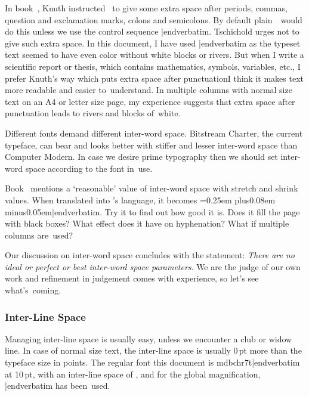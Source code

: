 {{In book~\cite{knuth_texbook}, Knuth instructed \capstex\ to give some extra space after periods, commas, question and exclamation marks, colons and semicolons. By default plain~\capstex\ would do this unless we use the control sequence {\color{brown}\verbatim \frenchspacing|endverbatim}. Tschichold urges not to give such extra space. In this document, I have used {\color{brown}\verbatim \frenchspacing|endverbatim} as the typeset text seemed to have even color without white blocks or rivers. But when I write a scientific report or thesis, which contains mathematics, symbols, variables, etc., I prefer Knuth's way which puts extra space after punctuation\emdash I think it makes text more readable and easier to~understand. In multiple columns with normal size text on an A4 or letter size page, my experience suggests that extra space after punctuation leads to rivers and blocks of~white.

Different fonts demand different inter-word space. Bitstream Charter, the current typeface, can bear and looks better with stiffer and lesser inter-word space than Computer Modern. In case we desire prime typography then we should set inter-word space according to the font in~use.

Book~\cite{elements_typographic} mentions a `reasonable' value of inter-word space with stretch and shrink values. When translated into \capstex's language, it becomes {\color{brown}\verbatim \spaceskip=0.25em plus0.08em minus0.05em|endverbatim}. Try it to find out how good it is. Does it fill the page with black boxes? What effect does it have on hyphenation? What if multiple columns are~used?

Our discussion on inter-word space concludes with the statement: {\sl There are no ideal or perfect or best inter-word space parameters}. We are the judge of our own work and refinement in judgement comes with experience, so let's see what's~coming.

\subsubsection{Inter-Line Space}
Managing inter-line space is usually easy, unless we encounter a club or widow line. In case of normal size text, the inter-line space is usually 0\,pt more than the typeface size in points. The regular font this document is {\verbatim mdbchr7t|endverbatim} at 10\,pt, with an inter-line space of {\tt\the\baselineskip}, and for the global magnification, {\verbatim {}|endverbatim} has been~used.

}}
